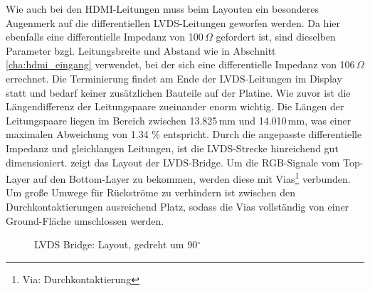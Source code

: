 Wie auch bei den HDMI-Leitungen muss beim Layouten ein besonderes Augenmerk auf die differentiellen LVDS-Leitungen geworfen werden. Da hier ebenfalls eine differentielle Impedanz von 100\,$\Omega$ gefordert ist, sind dieselben Parameter bzgl. Leitungsbreite und Abstand wie in Abschnitt \ref{cha:hdmi_eingang} verwendet, bei der sich eine differentielle Impedanz von 106\,$\Omega$ errechnet.  Die Terminierung findet am Ende der LVDS-Leitungen im Display statt und bedarf keiner zusätzlichen Bauteile auf der Platine. Wie zuvor ist die Längendifferenz der Leitungspaare zueinander enorm wichtig. Die Längen der Leitungspaare liegen im Bereich zwischen 13.825\,mm und 14.010\,mm, was einer maximalen Abweichung von 1.34 \% entspricht. Durch die angepasste differentielle Impedanz und gleichlangen Leitungen, ist die LVDS-Strecke hinreichend gut dimensioniert.  zeigt das Layout der LVDS-Bridge. Um die RGB-Signale vom Top-Layer auf den Bottom-Layer zu bekommen, werden diese mit Vias\footnote{Via: Durchkontaktierung} verbunden. Um große Umwege für Rückströme zu verhindern ist zwischen den Durchkontaktierungen ausreichend Platz, sodass die Vias vollständig von einer Ground-Fläche umschlossen werden.
\begin{figure}[htp]
		\center
        \caption{LVDS Bridge: Layout, gedreht um 90$^{\circ}$}
       \label{fig:teilb_lvds_bridge_pcb}
\end{figure}
\newpage
